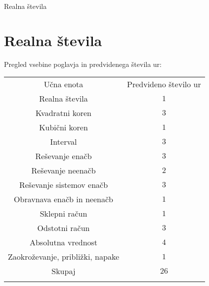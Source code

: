\begin{priprava}{0}{}{}{Realna števila}{}{}
    
    \chapter{Realna števila}

    \Large{Pregled vsebine poglavja in predvidenega števila ur:}

    \begin{table}[H]
        \centering
        \begin{tabular}{||c|c||} 
        \hhline{|t:==:t|}
        \rowcolor[rgb]{0.843,0.718,0.718} 
        Učna enota  & Predvideno število ur   \\ 
        \hhline{|:==:|}
        Realna števila & $1$    \\ 
        \hline
        Kvadratni koren & $3$    \\ 
        \hline
        Kubični koren & $1$    \\ 
        \hline
        Interval & $3$     \\
        \hline
        Reševanje enačb & $3$     \\
        \hline
        Reševanje neenačb & $2$    \\ 
        \hline
        Reševanje sistemov enačb & $3$    \\ 
        \hline
        Obravnava enačb in neenačb & $1$     \\
        \hline
        Sklepni račun & $1$     \\
        \hline
        Odstotni račun & $3$    \\ 
        \hline
        Absolutna vrednost & $4$    \\ 
        \hline
        Zaokroževanje, približki, napake & $1$     \\
        \hhline{|:==:|}
        Skupaj & $26$     \\
        \hhline{|b:==:b|}
        \end{tabular}
    \end{table}


    
\end{priprava}